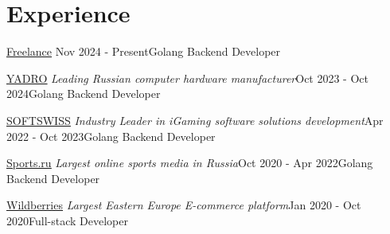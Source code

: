 \section{Experience}

\begin{experienceEntry}
{{\underline{Freelance}}}
{}{Nov 2024 - Present}{Golang Backend Developer}
    {}
\end{experienceEntry}

\vspace{1em}

\begin{experienceEntry}
{\href{https://yadro.com/}{\underline{YADRO}}}
{\textit{Leading Russian computer hardware manufacturer}}{Oct 2023 - Oct 2024}{Golang Backend Developer}
    {}
\end{experienceEntry}

\vspace{1em}

\begin{experienceEntry}
{\href{https://softswiss.com}{\underline{SOFTSWISS}}}
{\textit{Industry Leader in iGaming software solutions development}}{Apr 2022 - Oct 2023}{Golang Backend Developer}
    {}
\end{experienceEntry}

\vspace{1em}

\begin{experienceEntry}
{\href{https://sports.ru}{\underline{Sports.ru}}}
{\textit{Largest online sports media in Russia}}{Oct 2020 - Apr 2022}{Golang Backend Developer}
    {}
\end{experienceEntry}

\vspace{1em}

\begin{experienceEntry}
{\href{https://wildberries.ru}{\underline{Wildberries}}}
{\textit{Largest Eastern Europe E-commerce platform}}{Jan 2020 - Oct 2020}{Full-stack Developer}
    {}
\end{experienceEntry}

\vspace{1em}
